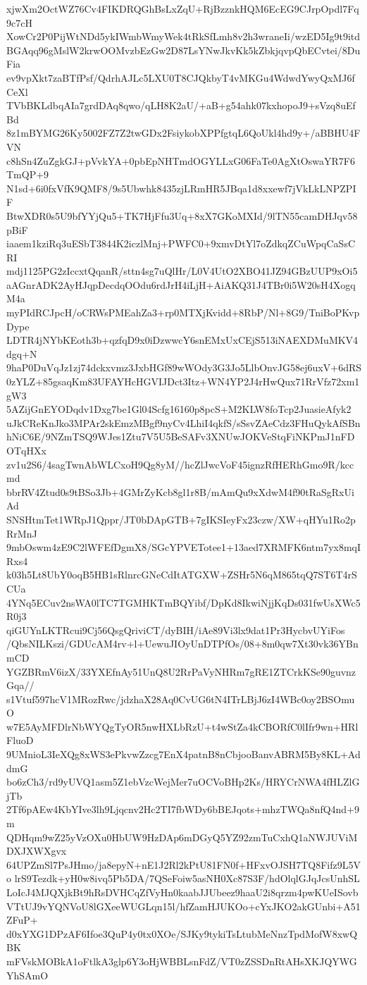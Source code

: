 xjwXm2OctWZ76Cv4FIKDRQGhBsLxZqU+RjBzznkHQM6EcEG9CJrpOpdl7Fq9c7cH
XowCr2P0PijWtNDd5ykIWmbWmyWek4tRkSfLmh8v2h3wraneIi/wzED5Ig9t9itd
BGAqq96gMslW2krwOOMvzbEzGw2D87LsYNwJkvKk5kZbkjqvpQbECvtei/8DuFia
ev9vpXkt7zaBTfPsf/QdrhAJLc5LXU0T8CJQkbyT4vMKGu4WdwdYwyQxMJ6fCeXl
TVbBKLdbqAIa7grdDAq8qwo/qLH8K2aU/+aB+g54ahk07kxhopoJ9+sVzq8uEfBd
8z1mBYMG26Ky5002FZ7Z2twGDx2FsiykobXPPfgtqL6QoUkl4hd9y+/aBBHU4FVN
c8hSn4ZuZgkGJ+pVvkYA+0pbEpNHTmdOGYLLxG06FaTe0AgXtOswaYR7F6TmQP+9
N1sd+6i0fxVfK9QMF8/9s5Ubwhk8435zjLRmHR5JBqa1d8xxewf7jVkLkLNPZPIF
BtwXDR0s5U9bfYYjQu5+TK7HjFfu3Uq+8xX7GKoMXId/9lTN55camDHJqv58pBiF
iaaem1kziRq3uESbT3844K2iczlMnj+PWFC0+9xmvDtYl7oZdkqZCuWpqCaSsCRI
mdj1125PG2zIccxtQqanR/sttn4sg7uQlHr/L0V4UtO2XBO41JZ94GBzUUP9xOi5
aAGnrADK2AyHJqpDecdqOOdu6rdJrH4iLjH+AiAKQ31J4TBr0i5W20sH4XogqM4a
myPIdRCJpcH/oCRWsPMEahZa3+rp0MTXjKvidd+8RbP/Nl+8G9/TniBoPKvpDype
LDTR4jNYbKEoth3b+qzfqD9x0iDzwwcY6snEMxUxCEjS513iNAEXDMuMKV4dgq+N
9haP0DuVqJz1zj74dckxvmz3JxbHGf89wWOdy3G3Jo5LlbOnvJG58ej6uxV+6dRS
0zYLZ+85gsaqKm83UFAYHcHGVIJDct3Itz+WN4YP2J4rHwQux71RrVfz72xm1gW3
5AZijGnEYODqdv1Dxg7be1Gl04Scfg16160p8pcS+M2KLW8foTcp2JuasieAfyk2
uJkCReKnJko3MPAr2skEmzMBgf9nyCv4LhiI4qkfS/sSsvZAeCdz3FHuQykAfSBn
hNiC6E/9NZmTSQ9WJes1Ztu7V5U5BeSAFv3XNUwJOKVeStqFiNKPmJ1nFDOTqHXx
zv1u2S6/4sagTwnAbWLCxoH9Qg8yM//hcZlJwcVoF45ignzRfHERhGmo9R/kccmd
bbrRV4Ztud0s9tBSo3Jb+4GMrZyKcb8gl1r8B/mAmQu9xXdwM4f90tRaSgRxUiAd
SNSHtmTet1WRpJ1Qppr/JT0bDApGTB+7gIKSIeyFx23czw/XW+qHYu1Ro2pRrMnJ
9mbOswm4zE9C2lWFEfDgmX8/SGcYPVETotee1+13aed7XRMFK6ntm7yx8mqIRxs4
k03h5Lt8UbY0oqB5HB1sRlnrcGNeCdItATGXW+ZSHr5N6qM865tqQ7ST6T4rSCUa
4YNq5ECuv2nsWA0lTC7TGMHKTmBQYibf/DpKd8IkwiNjjKqDs031fwUsXWc5R0j3
qiGUYnLKTRcui9Cj56QsgQriviCT/dyBIH/iAe89Vi3lx9dat1Pr3HycbvUYiFos
/QbsNILKszi/GDUcAM4rv+l+UewuJIOyUnDTPfOs/08+8m0qw7Xt30vk36YBnmCD
YGZBRmV6izX/33YXEfnAy51UnQ8U2RrPaVyNHRm7gRE1ZTCrkKSe90guvnzGqa//
s1Vtuf597hcV1MRozRwc/jdzhaX28Aq0CvUG6tN4ITrLBjJ6zI4WBc0oy2BSOmuO
w7E5AyMFDlrNbWYQgTyOR5nwHXLbRzU+t4wStZa4kCBORfC0lIfr9wn+HRlFluoD
9UMnioL3IeXQg8xWS3ePkvwZzcg7EnX4patnB8nCbjooBanvABRM5By8KL+AddmG
bo6zCh3/rd9yUVQ1asm5Z1ebVzcWejMer7uOCVoBHp2Ks/HRYCrNWA4fHLZlGjTb
2Tf6pAEw4KbYIve3lh9Ljqcnv2Hc2TI7fbWDy6bBEJqots+mhzTWQa8nfQ4nd+9m
QDHqm9wZ25yVzOXu0HbUW9HzDAp6mDGyQ5YZ92zmTuCxhQ1aNWJUViMDXJXWXgvx
64UPZmSl7PsJHmo/ja8epyN+nE1J2Rl2kPtU81FN0f+HFxvOJSH7TQ8Fifz9L5Vo
lrS9Tezdk+yH0w8ivq5Pb5DA/7QSeFoiw5asNH0Xc87S3F/hdOlqlGJqJcsUnhSL
LoIcJ4MJQXjkBt9hRsDVHCqZfVyHn0kaabJJUbeez9haaU2i8qrzm4pwKUeISovb
VTtUJ9vYQNVoU8lGXeeWUGLqn15l/hfZamHJUKOo+cYxJKO2akGUnbi+A51ZFuP+
d0xYXG1DPzAF6Ifoe3QuP4y0tx0XOe/SJKy9tykiTsLtubMeNnzTpdMofW8xwQBK
mFVskMOBkA1oFtlkA3glp6Y3oHjWBBLsnFdZ/VT0zZSSDnRtAHsXKJQYWGYhSAmO
